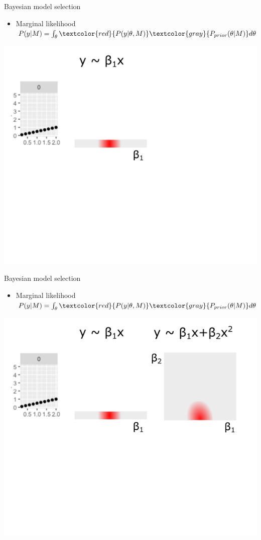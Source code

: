 \documentclass[10pt]{beamer}
\begin{document}
\begin{frame}{Bayesian model selection}
  \begin{itemize}
  \item Marginal likelihood $P(y|M) = \int_{\theta} \textcolor{red}{P(y|\theta, M)} \textcolor{gray}{P_{prior}(\theta|M)} d\theta$
  \end{itemize}
  \includegraphics[width=.7\textwidth]{bms-1.png}
\end{frame}
\begin{frame}{Bayesian model selection}
  \begin{itemize}
  \item Marginal likelihood $P(y|M) = \int_{\theta} \textcolor{red}{P(y|\theta, M)} \textcolor{gray}{P_{prior}(\theta|M)} d\theta$
  \end{itemize}
  \includegraphics[width=.7\textwidth]{bms-2.png}
\end{frame}
\end{document}
